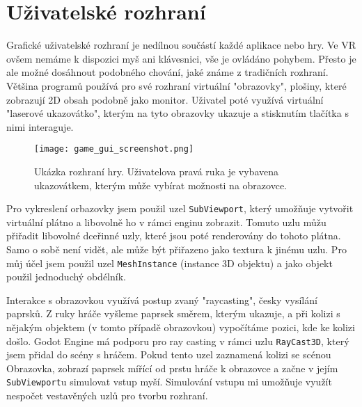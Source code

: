 \label{uzivatelske_rozhrani}
\section{Uživatelské rozhraní}

Grafické uživatelské rozhraní je nedílnou součástí každé aplikace nebo hry. Ve VR ovšem nemáme k dispozici myš ani klávesnici, vše je ovládáno pohybem. Přesto je ale možné dosáhnout podobného chování, jaké známe z tradičních rozhraní. Většina programů používá pro své rozhraní virtuální "obrazovky", plošiny, které zobrazují 2D obsah podobně jako monitor. Uživatel poté využívá virtuální "laserové ukazovátko", kterým na tyto obrazovky ukazuje a stisknutím tlačítka s nimi interaguje.

\begin{figure}[H]
  \centering
  \texttt{[image: game\_gui\_screenshot.png]}
  \caption{Ukázka rozhraní hry. Uživatelova pravá ruka je vybavena ukazovátkem, kterým může vybírat možnosti na obrazovce.}
  \label{game_gui_screenshot}
\end{figure}

Pro vykreslení orbazovky jsem použil uzel \texttt{SubViewport}, který umožňuje vytvořit virtuální plátno a libovolně ho v rámci enginu zobrazit. Tomuto uzlu můžu přiřadit libovolné dceřinné uzly, které jsou poté renderovány do tohoto plátna. Samo o sobě není vidět, ale může být přiřazeno jako textura k jinému uzlu. Pro můj účel jsem použil uzel \texttt{MeshInstance} (instance 3D objektu) a jako objekt použil jednoduchý obdélník.

Interakce s obrazovkou využívá postup zvaný "raycasting", česky vysílání paprsků. Z ruky hráče vyšleme paprsek směrem, kterým ukazuje, a při kolizi s nějakým objektem (v tomto případě obrazovkou) vypočítáme pozici, kde ke kolizi došlo. Godot Engine má podporu pro ray casting v rámci uzlu \texttt{RayCast3D}, který jsem přidal do scény s hráčem. Pokud tento uzel zaznamená kolizi se scénou Obrazovka, zobrazí paprsek mířící od prstu hráče k obrazovce a začne v jejím \texttt{SubViewport}u simulovat vstup myší. Simulování vstupu mi umožňuje využít nespočet vestavěných uzlů pro tvorbu rozhraní.